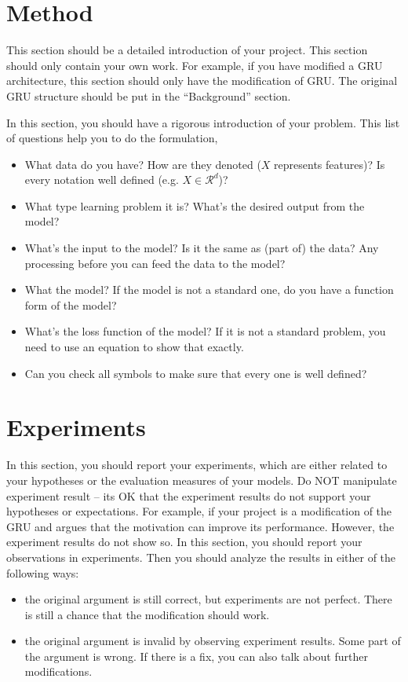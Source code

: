 \documentclass[11pt]{article}
\begin{document}
\section{Method}

This section should be a detailed introduction of your project. This section should only contain your own work. For example, if you have modified a GRU architecture, this section should only have the modification of GRU. The original GRU structure should be put in the ``Background'' section.  

In this section, you should have a rigorous introduction of your problem. This list of questions help you to do the formulation,
\begin{itemize}
\item What data do you have? How are they denoted ($X$ represents features)? Is every notation well defined (e.g. $X \in \mathcal{R}^d$)? 
\item What type learning problem it is? What's the desired output from the model? 
\item What's the input to the model? Is it the same as (part of) the data? Any processing before you can feed the data to the model?
\item What the model? If the model is not a standard one, do you have a function form of the model?
\item What's the loss function of the model? If it is not a standard problem, you need to use an equation to show that exactly. 
\item Can you check all symbols to make sure that every one is well defined?
\end{itemize}


\section{Experiments}

In this section, you should report your experiments, which are either related to your hypotheses or the evaluation measures of your models. Do NOT manipulate experiment result --  its OK that the experiment results do not support your hypotheses or expectations. For example, if your project is a modification of the GRU and argues that the motivation can improve its performance. However, the experiment results do not show so. In this section, you should report your observations in experiments. Then you should analyze the results in either of the following ways:
\begin{itemize}
\item the original argument is still correct, but experiments are not perfect. There is still a chance that the modification should work.  
\item the original argument is invalid by observing experiment results. Some part of the argument is wrong. If there is a fix, you can also talk about further modifications.  
\end{itemize}
\end{document}
